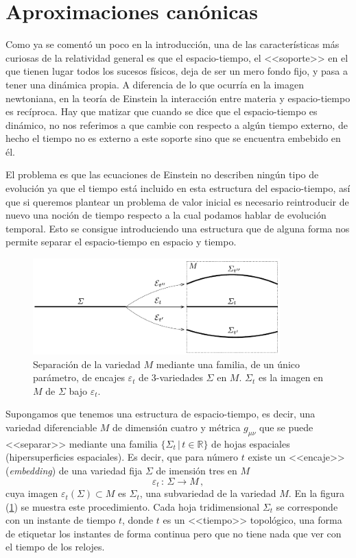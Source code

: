 \documentclass[11pt,a4paper,titlepage]{article}
\begin{document}
\section{Aproximaciones canónicas} %

Como ya se comentó un poco en la introducción, una de las características más curiosas de la relatividad general es que el espacio-tiempo, el <<soporte>> en el que tienen lugar todos los sucesos físicos, deja de ser un mero fondo fijo, y pasa a tener una dinámica propia. A diferencia de lo que ocurría en la imagen newtoniana, en la teoría de Einstein la interacción entre materia y espacio-tiempo es recíproca. Hay que matizar que cuando se dice que el espacio-tiempo es dinámico, no nos referimos a que cambie con respecto a algún tiempo externo, de hecho el tiempo no es externo a este soporte sino que se encuentra embebido en él.

El problema es que las ecuaciones de Einstein no describen ningún tipo de evolución ya que el tiempo está incluido en esta estructura del espacio-tiempo, así que si queremos plantear un problema de valor inicial es necesario reintroducir de nuevo una noción de tiempo respecto a la cual podamos hablar de evolución temporal. Esto se consigue introduciendo una estructura que de alguna forma nos permite separar el espacio-tiempo en espacio y tiempo.

\begin{figure}[ht]
\centering
\includegraphics[width=0.85\textwidth]{FoilM.png}
\caption{Separación de la variedad $M$ mediante una familia, de un único parámetro, de encajes $\varepsilon_t$ de 3-variedades $\Sigma$ en $M$. $\Sigma_t$ es la imagen en $M$ de $\Sigma$ bajo $\varepsilon_t$.}
\label{fig:FoilM}
\end{figure}


Supongamos que tenemos una estructura de espacio-tiempo, es decir, una variedad diferenciable $M$ de dimensión cuatro y métrica $g_{\mu\nu}$ que se puede <<separar>> mediante una familia $\{\Sigma_t\,|\,t\in\mathbb{R}\}$ de hojas espaciales (hipersuperficies espaciales). Es decir, que para número $t$ existe un <<encaje>> (\emph{embedding}) de una variedad fija $\Sigma$ de imensión tres en $M$
\begin{equation*}
 \varepsilon_t\,:\,\Sigma\rightarrow M\,,
\end{equation*}
cuya imagen $\varepsilon_t(\Sigma)\subset M$ es $\Sigma_t$, una subvariedad de la variedad $M$. En la figura (\ref{fig:FoilM}) se muestra este procedimiento. Cada hoja tridimensional $\Sigma_t$ se corresponde con un instante de tiempo $t$, donde $t$ es un <<tiempo>> topológico, una forma de etiquetar los instantes de forma continua pero que no tiene nada que ver con el tiempo de los relojes.
\end{document}
